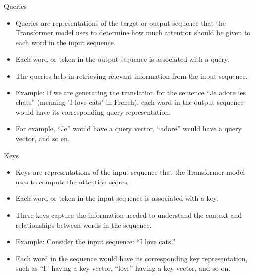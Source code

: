 \documentclass[handout]{beamer}
\begin{document}
\begin{frame}{Queries}



\begin{scriptsize}
\begin{itemize}
\item Queries are representations of the target or output sequence that the Transformer model uses to determine how much attention should be given to each word in the input sequence.
\item Each word or token in the output sequence is associated with a query.
\item The queries help in retrieving relevant information from the input sequence.
\item Example: If we are generating the translation for the sentence ``Je adore les chats'' (meaning "I love cats" in French), each word in the output sequence would have its corresponding query representation.
\item For example, ``Je'' would have a query vector, ``adore'' would have a query vector, and so on.


\end{itemize}

\end{scriptsize}

\end{frame}


\begin{frame}{Keys}



\begin{scriptsize}
\begin{itemize}
\item Keys are representations of the input sequence that the Transformer model uses to compute the attention scores.
\item Each word or token in the input sequence is associated with a key.
\item These keys capture the information needed to understand the context and relationships between words in the sequence.
\item Example: Consider the input sequence: ``I love cats.''
\item Each word in the sequence would have its corresponding key representation, such as ``I'' having a key vector, ``love'' having a key vector, and so on.

\end{itemize}

\end{scriptsize}

\end{frame}
\end{document}
